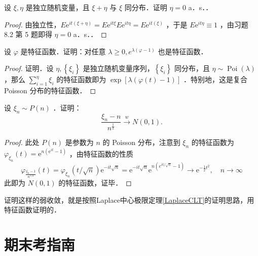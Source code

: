 \begin{exercise}
    设 $\xi, \eta$ 是独立随机变量，且 $\xi+\eta$ 与 $\xi$ 同分布．证明 $\eta=0$ a．s．．
\end{exercise}
\begin{proof}
    由独立性，$E \mathrm{e}^{i t(\xi+\eta)}=E \mathrm{e}^{i t \xi} E \mathrm{e}^{i t \eta}=E \mathrm{e}^{i t(\xi)}$ ，于是 $E \mathrm{e}^{i t \eta} \equiv 1$ ，由习题 8.2 第 5 题即得 $\eta=0$ a．s．．
\end{proof}

\begin{exercise}
    设 $\varphi$ 是特征函数．证明：对任意 $\lambda \geqslant 0, e^{\lambda(\varphi-1)}$ 也是特征函数．
\end{exercise}
\begin{proof}
    证明．设 $\eta,\left\{\xi_i\right\}$ 是独立随机变量序列，$\left\{\xi_i\right\}$ 同分布，且 $\eta \sim \operatorname{Poi}(\lambda)$ ，那么 $\sum_{i=1}^\eta \xi_i$ 的特征函数即为 $\exp [\lambda(\varphi(t)-1)]$ ．特别地，这是复合 Poisson 分布的特征函数．
\end{proof}

\begin{exercise}
    设 $\xi_n \sim P(n)$ ．证明：
    $$
    \frac{\xi_n-n}{n^{\frac{1}{2}}} \xrightarrow{w} N(0,1) .
    $$
\end{exercise}
\begin{proof}
    此处 $P(n)$ 是参数为 $n$ 的 Poisson 分布，注意到 $\xi_n$ 的特征函数为 $\varphi_{\xi_n}(t)=\mathrm{e}^{n\left(\mathrm{e}^{i t}-1\right)}$ ，由特征函数的性质
$$
\varphi_{\frac{\xi_n-1}{n^{1 / 2}}}(t)=\varphi_{\xi_n}(t / \sqrt{n}) \mathrm{e}^{-i t \sqrt{n}}=\mathrm{e}^{-i t \sqrt{n}} \mathrm{e}^{n\left(e^{i t / \sqrt{n}}-1\right)} \rightarrow \mathrm{e}^{-\frac{1}{2} t^2}, \quad n \rightarrow \infty
$$
此即为 $N(0,1)$ 的特征函数，证毕．
\end{proof}
\begin{remark}
    证明这样的弱收敛，就是按照Laplace中心极限定理\ref{LaplaceCLT}的证明思路，用特征函数证明的．
\end{remark}












\section{期末考指南}


